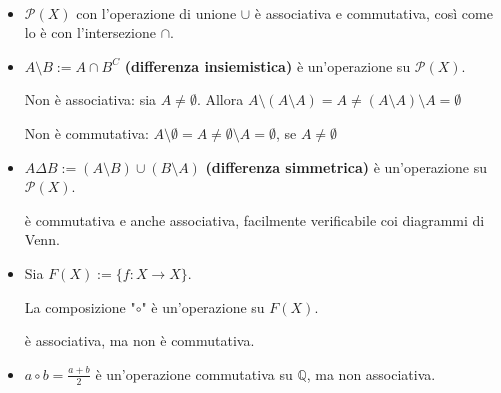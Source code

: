 \documentclass[../main.tex]{subfiles}
\begin{document}
\begin{example}
    \
    \begin{itemize}
        \item $\mathcal{P}(X)$ con l'operazione di unione $\cup$ è associativa e commutativa, così come lo è con l'intersezione $\cap $.
        \item $A \setminus B  := A \cap B^C$ \textbf{(differenza insiemistica)} è un'operazione su $\mathcal{P}(X)$.

              Non è associativa: sia $A \neq \emptyset.$ Allora $A \setminus (A \setminus A) = A \neq (A\setminus A) \setminus A = \emptyset$

              Non è commutativa: $A \setminus \emptyset = A \neq \emptyset \setminus A = \emptyset$, se $A \neq \emptyset$
        \item $A \Delta B := (A \setminus B) \cup (B \setminus A)$ \textbf{(differenza simmetrica)}
              è un'operazione su $\mathcal{P}(X)$.

              è commutativa e anche associativa, facilmente verificabile coi diagrammi di Venn.
        \item Sia $F(X) := \{f : X\rightarrow X\}$.

              La composizione "$\circ$" è un'operazione su $F(X)$.

              è associativa, ma non è commutativa.
        \item $a \circ b = \frac{a + b}{2} $ è un'operazione commutativa su $\mathbb{Q}$, ma non associativa.
    \end{itemize}
\end{example}
\end{document}
